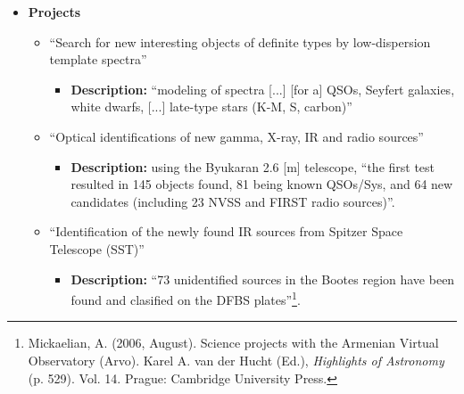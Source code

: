 \begin{itemize}
\item \textbf{Projects}
\begin{itemize}
\item ``Search for new interesting objects of definite types by low-dispersion
template spectra'' 
\begin{itemize}
\item \textbf{Description:} ``modeling of spectra [...] [for a] QSOs, Seyfert
galaxies, white dwarfs, [...] late-type stars (K-M, S, carbon)'' 
\end{itemize}
\end{itemize}
\begin{itemize}
\item ``Optical identifications of new gamma, X-ray, IR and radio sources''
\begin{itemize}
\item \textbf{Description:} using the Byukaran 2.6 [m] telescope, ``the first
test resulted in 145 objects found, 81 being known QSOs/Sys, and 64 new
candidates (including 23 NVSS and FIRST radio sources)''.
\end{itemize}
\end{itemize}
\begin{itemize}
\item ``Identification of the newly found IR sources from Spitzer Space
Telescope (SST)''
\begin{itemize}
\item \textbf{Description:} ``73 unidentified sources in the Bootes region have
been found and clasified on the DFBS plates''\footnote{Mickaelian, A. (2006, August). Science projects with
the Armenian Virtual Observatory (Arvo). Karel A. van der Hucht (Ed.),
\textit{Highlights of Astronomy} (p. 529). Vol. 14. Prague: Cambridge University
Press. }.
\end{itemize}
\end{itemize}
\end{itemize}

